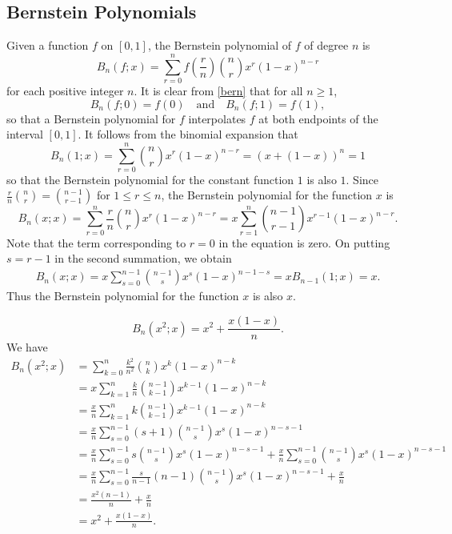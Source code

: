 \documentclass[12pt]{article}
\begin{document}
\subsection{Bernstein Polynomials}
Given a function $f$ on $[0, 1]$, the Bernstein polynomial of $f$ of degree $n$ is
\begin{equation}
B_n(f; x) = \sum_{r=0}^n  f\left(\frac{r}{n}\right) \binom{n}{r} x^r (1-x)^{n-r}
\label{bern}
\end{equation}
for each positive integer $n$. It is clear from \eqref{bern} that for all $n \geq 1$,
\begin{equation}
    B_n(f;0)=f(0) \quad \text{and} \quad B_n(f;1)=f(1),
\end{equation}
so that a Bernstein polynomial for $f$ interpolates $f$ at both endpoints of the interval $[0, 1]$.
It follows from the binomial expansion that
\begin{equation}
B_n(1; x) = \sum_{r=0}^n \binom{n}{r} x^r (1-x)^{n-r}=(x+(1-x))^n=1
\label{bern_1}
\end{equation}
so that the Bernstein polynomial for the constant function $1$ is also $1$. Since $\frac{r}{n} \binom{n}{r} = \binom{n-1}{r-1}
$
for $1 \leq r \leq n$, the Bernstein polynomial for the function $x$ is 
\begin{equation}
B_n(x; x) = \sum_{r=0}^n \frac{r}{n} \binom{n}{r} x^r (1-x)^{n-r} = x \sum_{r=1}^n \binom{n-1}{r-1} x^{r-1}(1-x)^{n-r}.
\label{bern_x}
\end{equation}
Note that the term corresponding to $r=0$ in the equation is zero. On putting $s = r-1$ in the second summation, we obtain \begin{gather*}
    B_n(x;x) = x \sum_{s=0}^{n-1} \binom{n-1}{s} x^s (1-x)^{n-1-s} = xB_{n-1}(1; x) = x.
\end{gather*}
Thus the Bernstein polynomial for the function $x$ is also $x$.
\begin{example}
   \begin{equation}
       \label{bernx2}
       B_n(x^2;x) = x^2 + \frac{x(1-x)}{n}.
   \end{equation}
       We have
       \begin{align*}
           B_n(x^2;x)
           &=\sum_{k=0}^n\frac{k^2}{n^2}\binom{n}{k}x^k(1-x)^{n-k}\\
           &=x\sum_{k=1}^n\frac{k}{n}\binom{n-1}{k-1}x^{k-1}(1-x)^{n-k}\\
           &=\frac{x}{n}\sum_{k=1}^nk\binom{n-1}{k-1}x^{k-1}(1-x)^{n-k}\\
           &=\frac{x}{n}\sum_{s=0}^{n-1}(s+1)\binom{n-1}{s}x^s(1-x)^{n-s-1}\\
           &=\frac{x}{n}\sum_{s=0}^{n-1}s\binom{n-1}{s}x^s(1-x)^{n-s-1}+\frac{x}{n}\sum_{s=0}^{n-1}\binom{n-1}{s}x^s(1-x)^{n-s-1}\\
           &=\frac{x}{n}\sum_{s=0}^{n-1}\frac{s}{n-1}(n-1)\binom{n-1}{s}x^s(1-x)^{n-s-1}+\frac{x}{n}\\
           &=\frac{x^2(n-1)}{n}+\frac{x}{n}\\
           &=x^2 + \frac{x(1-x)}{n}.
       \end{align*}
\end{example}
\end{document}
